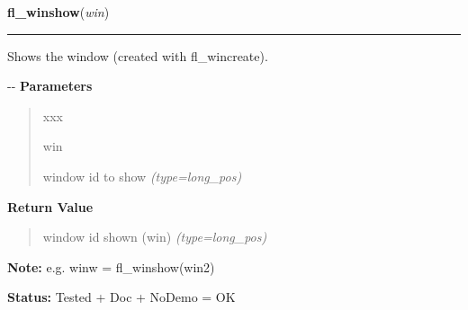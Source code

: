 \hspace{.8\funcindent}\begin{boxedminipage}{\funcwidth}

    \raggedright \textbf{fl\_winshow}(\textit{win})

    \vspace{-1.5ex}

    \rule{\textwidth}{0.5\fboxrule}
\setlength{\parskip}{2ex}

Shows the window (created with fl\_wincreate).

-{}-
\setlength{\parskip}{1ex}
      \textbf{Parameters}
      \vspace{-1ex}

      \begin{quote}
        \begin{Ventry}{xxx}

          \item[win]


window id to show
            {\it (type=long\_pos)}

        \end{Ventry}

      \end{quote}

      \textbf{Return Value}
    \vspace{-1ex}

      \begin{quote}

window id shown (win)
      {\it (type=long\_pos)}

      \end{quote}

\textbf{Note:} 
e.g. winw = fl\_winshow(win2)


\textbf{Status:} 
Tested + Doc + NoDemo = OK


    \end{boxedminipage}

    \label{xformslib:flxbasic:fl_winopen}

    \vspace{0.5ex}


